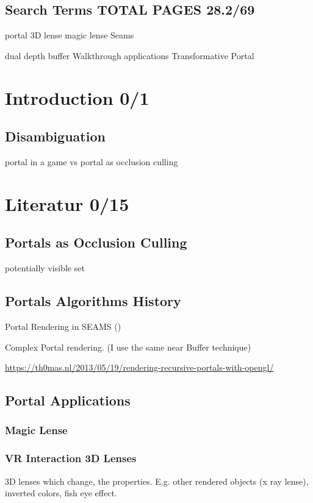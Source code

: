 
\subsection*{Search Terms TOTAL PAGES 28.2/69}
portal
3D lense
magic lense
Seams

dual depth buffer
Walkthrough applications
Transformative Portal
\section{Introduction 0/1}

\subsection{Disambiguation}
portal in a game
vs
portal as occlusion culling

\section{Literatur 0/15}

\subsection{Portals as Occlusion Culling}
potentially visible set
\cite{luebke:1995:portals}
\cite{yang:2014:walkthrough}

\subsection{Portals Algorithms History}


Portal Rendering in SEAMS (\cite{schmalstieg:1999:sewing})

Complex Portal rendering. (I use the same near Buffer technique) \cite{ lowe:2005:technique}


\url{https://th0mas.nl/2013/05/19/rendering-recursive-portals-with-opengl/}
\subsection{Portal Applications}

\subsubsection{Magic Lense}
\cite{viega:1996:3d}


\subsubsection{VR Interaction 3D Lenses}
\cite{borst:2009:real}
3D lenses which change, the properties. E.g. other rendered objects (x ray lense), inverted colors, fish eye effect.

